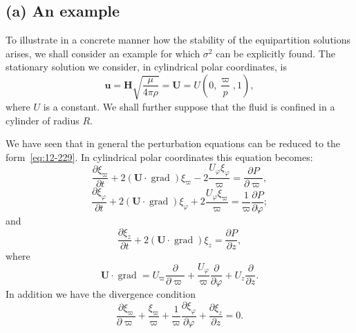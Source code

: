 \subsection*{(a) An example}

To illustrate in a concrete manner how the stability of the equipartition solutions arises, we shall consider an example for which $\sigma^2$ can be explicitly found. The stationary solution we consider, in cylindrical polar coordinates, is
\begin{equation}
\label{eq:12-243}
\mathbf{u} = \mathbf{H}\sqrt{\frac{\mu}{4\pi\rho}} = \mathbf{U} = U\left(0, \frac{\varpi}{p}, 1\right),
\end{equation}
where $U$ is a constant. We shall further suppose that the fluid is confined in a cylinder of radius $R$.

We have seen that in general the perturbation equations can be reduced to the form~\eqref{eq:12-229}. In cylindrical polar coordinates this equation becomes:
\begin{equation}
\label{eq:12-244}
\frac{\partial\xi_\varpi}{\partial t} + 2(\mathbf{U}\cdot\operatorname{grad})\xi_\varpi - 2\frac{U_\varphi\xi_\varphi}{\varpi} = \frac{\partial P}{\partial\varpi},
\end{equation}
\begin{equation}
\label{eq:12-245}
\frac{\partial\xi_\varphi}{\partial t} + 2(\mathbf{U}\cdot\operatorname{grad})\xi_\varphi + 2\frac{U_\varphi\xi_\varpi}{\varpi} = \frac{1}{\varpi}\frac{\partial P}{\partial\varphi};
\end{equation}
and
\begin{equation}
\label{eq:12-246}
\frac{\partial\xi_z}{\partial t} + 2(\mathbf{U}\cdot\operatorname{grad})\xi_z = \frac{\partial P}{\partial z},
\end{equation}
where
\begin{equation}
\label{eq:12-247}
\mathbf{U}\cdot\operatorname{grad} = U_\varpi\frac{\partial}{\partial\varpi} + \frac{U_\varphi}{\varpi}\frac{\partial}{\partial\varphi} + U_z\frac{\partial}{\partial z}.
\end{equation}
In addition we have the divergence condition
\begin{equation}
\label{eq:12-248}
\frac{\partial\xi_\varpi}{\partial\varpi} + \frac{\xi_\varpi}{\varpi} + \frac{1}{\varpi}\frac{\partial\xi_\varphi}{\partial\varphi} + \frac{\partial\xi_z}{\partial z} = 0.
\end{equation}

